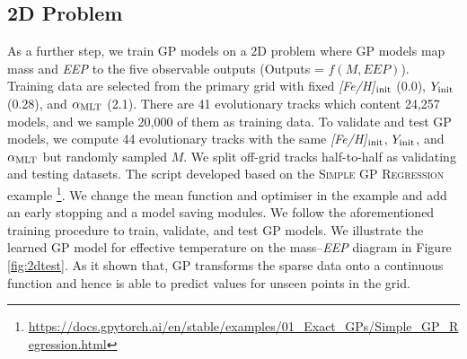\subsection{2D Problem}\label{sec:2d}

As a further step, we train GP models on a 2D problem where GP models map mass and {\it EEP} to the five observable outputs (Outputs = $f(M, EEP)$). Training data are selected from the primary grid with fixed {\it [Fe/H]}$_{\rm init}$ (0.0), $Y_{\rm init}$ (0.28), and $\alpha_{\rm MLT}$ (2.1). There are 41 evolutionary tracks which content 24,257 models, and we sample 20,000 of them as training data. To validate and test GP models, we compute 44 evolutionary tracks with the same {\it [Fe/H]}$_{\rm init}$, $Y_{\rm init}$, and $\alpha_{\rm MLT}$ but randomly sampled $M$. We split off-grid tracks half-to-half as validating and testing datasets. 
%
The script developed based on the \textsc{Simple GP Regression} example \footnote{\url{https://docs.gpytorch.ai/en/stable/examples/01_Exact_GPs/Simple_GP_Regression.html}}. We change the mean function and optimiser in the example and add an early stopping and a model saving modules.  
%
We follow the aforementioned training procedure to train, validate, and test GP models. We illustrate the learned GP model for effective temperature on the mass--{\it EEP} diagram in Figure \ref{fig:2dtest}. As it shown that, GP transforms the sparse data onto a continuous function and hence is able to predict values for unseen points in the grid. 
%


